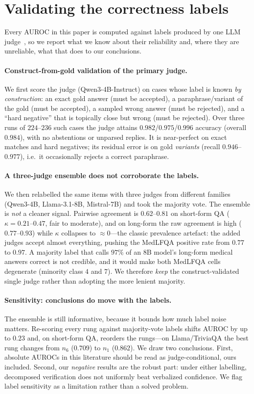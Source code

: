 \documentclass[11pt]{article}
\begin{document}
\section{Validating the correctness labels}\label{sec:judge}
Every AUROC in this paper is computed against labels produced by one LLM
judge~\citep{zheng2023judge}, so we report what we know about their reliability and, where they
are unreliable, what that does to our conclusions.

\paragraph{Construct-from-gold validation of the primary judge.} We first score the judge
(Qwen3-4B-Instruct) on cases whose label is known \emph{by construction}: an exact gold answer
(must be accepted), a paraphrase/variant of the gold (must be accepted), a sampled wrong answer
(must be rejected), and a ``hard negative'' that is topically close but wrong (must be
rejected). Over three runs of $224$--$236$ such cases the judge attains
$0.982$/$0.975$/$0.996$ accuracy (overall $0.984$), with no abstentions or unparsed replies. It
is near-perfect on exact matches and hard negatives; its residual error is on gold
\emph{variants} (recall $0.946$--$0.977$), i.e.\ it occasionally rejects a correct paraphrase.

\paragraph{A three-judge ensemble does not corroborate the labels.} We then relabelled the same
items with three judges from different families (Qwen3-4B, Llama-3.1-8B, Mistral-7B) and took
the majority vote. The ensemble is \emph{not} a cleaner signal. Pairwise agreement is
$0.62$--$0.81$ on short-form QA ($\kappa=0.21$--$0.47$, fair to moderate), and on long-form the
raw agreement is high ($0.77$--$0.93$) while $\kappa$ collapses to $\approx0$---the classic
prevalence artefact: the added judges accept almost everything, pushing the MedLFQA positive
rate from $0.77$ to $0.97$. A majority label that calls $97\%$ of an 8B model's long-form
medical answers correct is not credible, and it would make both MedLFQA cells degenerate
(minority class $4$ and $7$). We therefore \emph{keep} the construct-validated single judge
rather than adopting the more lenient majority.

\paragraph{Sensitivity: conclusions do move with the labels.} The ensemble is still
informative, because it bounds how much label noise matters. Re-scoring every rung against
majority-vote labels shifts AUROC by up to $0.23$ and, on short-form QA, reorders the
rungs---on Llama/TriviaQA the best rung changes from $n_6$ ($0.709$) to $n_1$ ($0.862$). We
draw two conclusions. First, absolute AUROCs in this literature should be read as
judge-conditional, ours included. Second, our \emph{negative} results are the robust part:
under either labelling, decomposed verification does not uniformly beat verbalized confidence.
We flag label sensitivity as a limitation rather than a solved problem.
\end{document}
